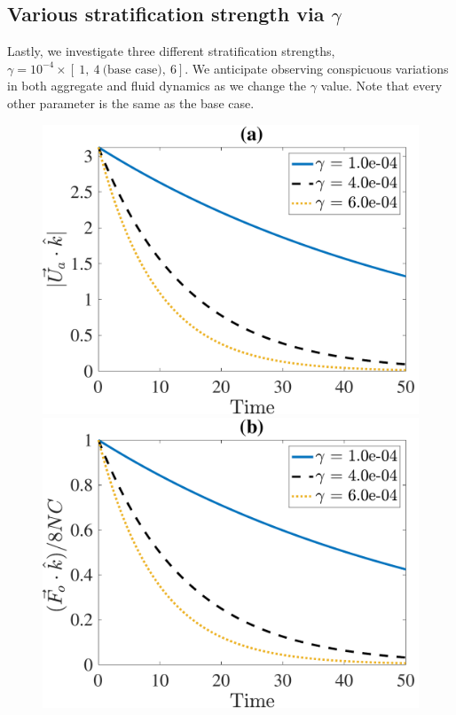 \subsection{Various stratification strength via $\gamma$}
Lastly, we investigate three different stratification strengths, $\gamma = 10^{-4} \times \left[ \ 1, \ 4 \ \text{(base case)}, \  6 \right]$. We anticipate observing conspicuous variations in both aggregate and fluid dynamics as we change the $\gamma$ value. Note that every other parameter is the same as the base case. 
\begin{figure}[h]
	\begin{center}
		\includegraphics[scale=0.35]{./figures/fig_NC50_g_Ua3_all}
		\includegraphics[scale=0.35]{./figures/fig_NC50_g_Fo3_all}

\end{center}
\end{figure}
